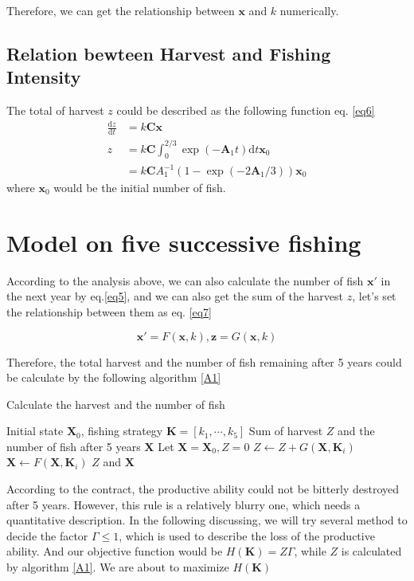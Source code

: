 \documentclass{IEEEtran}
\begin{document}
Therefore, we can get the relationship between $\bm x$ and $k$ numerically.
\subsection{Relation bewteen Harvest and Fishing Intensity}
The total of harvest $z$ could be described as the following function eq. \ref{eq6}
\begin{align}
    \label{eq6}
    \frac {\mathrm dz}{\mathrm dt} &= k\pmb C \bm x\\
    z &= k\pmb C\int_0^{2/3}\exp(-\pmb A_1t)\mathrm dt\bm x_0 \\ 
    &= k\pmb C  A_1^{-1} (1-\exp(-2\pmb A_1/3))\bm x_0
\end{align}
where $\bm x_0$ would be the initial number of fish.

\section{Model on five successive fishing}\label{model2}

According to the analysis above, we can also calculate the number of fish $\bm x'$ in the next year by eq.\ref{eq5}, and we can also get the sum of the harvest $z$, let's set the relationship between them as eq. \ref{eq7}

\begin{equation}
    \label{eq7}
    \bm x' = F(\bm x, k), \bm z = G(\bm x,k)
\end{equation}

Therefore, the total harvest and the number of fish remaining after 5 years could be calculate by the following algorithm \ref{A1}

\begin{algorithm}[h]
    \caption{Calculate the harvest and the number of fish}\label{A1}
    \begin{algorithmic}
        \Require Initial state $\bm X_0$, fishing strategy $\bm K = [k_1,\cdots,k_5]$ 
        \Ensure Sum of harvest $Z$ and the number of fish after 5 years $\bm X$
        \State Let $\bm X = \bm X_0, Z = 0$
        \State $Z \leftarrow Z + G(\bm X,\bm K_i)$
        \State $\bm X \leftarrow F(\bm X, \bm K_i)$
        \EndFor
    \State \Return $Z$ and $\bm X$
    \end{algorithmic}
\end{algorithm}

According to the contract, the productive ability could not be bitterly destroyed after 5 years. However, this rule is a relatively blurry one, which needs a quantitative description. In the following discussing, we will try several method to decide the factor $\Gamma \le 1$, which is used to describe the loss of the productive ability. And our objective function would be $H(\bm K) = Z\Gamma$, while $Z$ is calculated by algorithm \ref{A1}. We are about to maximize $H(\bm K)$
\end{document}
